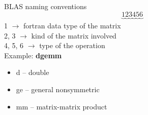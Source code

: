 	\begin{frame}{BLAS naming conventions}
	\[
		\underbrace{1}_{} \underbrace{2}_{} \underbrace{3}_{} \underbrace{4}_{} \underbrace{5}_{} \underbrace{6}_{}
	\]
	1 $\rightarrow$ fortran data type of the matrix \\
	2, 3 $\rightarrow$ kind of the matrix involved \\
	4, 5, 6 $\rightarrow$ type of the operation \\
	
	Example:
	\textbf{dgemm}
	\begin{itemize}
		\item d -- double
		\item ge -- general nonsymmetric
		\item mm -- matrix-matrix product
	\end{itemize}
	\end{frame}
